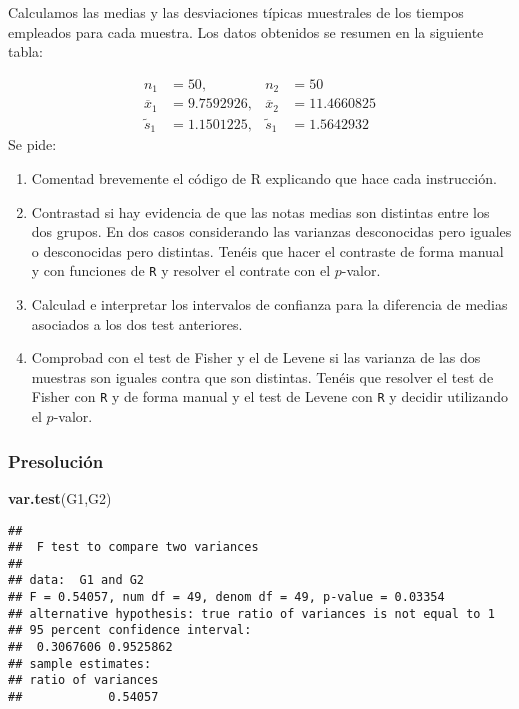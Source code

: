\documentclass[
]{article}
\newenvironment{Shaded}{\begin{snugshade}}{\end{snugshade}}
\newcommand{\KeywordTok}[1]{\textcolor[rgb]{0.13,0.29,0.53}{\textbf{#1}}}
\newcommand{\NormalTok}[1]{#1}
\providecommand{\tightlist}{%
  \setlength{\itemsep}{0pt}\setlength{\parskip}{0pt}}
\begin{document}
Calculamos las medias y las desviaciones típicas muestrales de los
tiempos empleados para cada muestra. Los datos obtenidos se resumen en
la siguiente tabla:

\[
\begin{array}{llll}
n_1&=50, & n_2&=50\\
\overline{x}_1&=9.7592926, & \overline{x}_2&=11.4660825\\
\tilde{s}_1&=1.1501225, & \tilde{s}_1&=1.5642932
\end{array}
\] Se pide:

\begin{enumerate}
\def\labelenumi{\arabic{enumi}.}
\tightlist
\item
  Comentad brevemente el código de R explicando que hace cada
  instrucción.
\item
  Contrastad si hay evidencia de que las notas medias son distintas
  entre los dos grupos. En dos casos considerando las varianzas
  desconocidas pero iguales o desconocidas pero distintas. Tenéis que
  hacer el contraste de forma manual y con funciones de \texttt{R} y
  resolver el contrate con el \(p\)-valor.
\item
  Calculad e interpretar los intervalos de confianza para la diferencia
  de medias asociados a los dos test anteriores.
\item
  Comprobad con el test de Fisher y el de Levene si las varianza de las
  dos muestras son iguales contra que son distintas. Tenéis que resolver
  el test de Fisher con \texttt{R} y de forma manual y el test de Levene
  con \texttt{R} y decidir utilizando el \(p\)-valor.
\end{enumerate}

\hypertarget{presoluciuxf3n}{%
\subsubsection{Presolución}\label{presoluciuxf3n}}

\begin{Shaded}
\begin{Highlighting}[]
\KeywordTok{var.test}\NormalTok{(G1,G2)}
\end{Highlighting}
\end{Shaded}

\begin{verbatim}
## 
##  F test to compare two variances
## 
## data:  G1 and G2
## F = 0.54057, num df = 49, denom df = 49, p-value = 0.03354
## alternative hypothesis: true ratio of variances is not equal to 1
## 95 percent confidence interval:
##  0.3067606 0.9525862
## sample estimates:
## ratio of variances 
##            0.54057
\end{verbatim}
\end{document}
